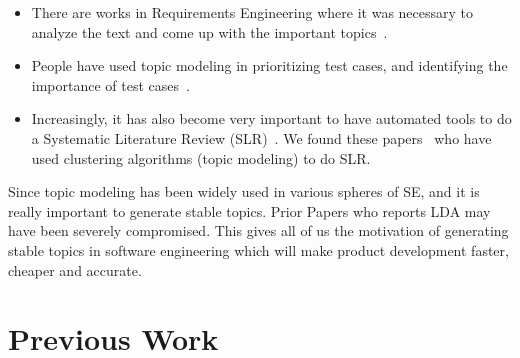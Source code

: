 \documentclass[conference]{IEEEtran}
\theoremstyle{break}
\begin{document}
\begin{itemize}
    \item There are works in Requirements Engineering where it was necessary to analyze the text and come up with the important topics~\cite{asuncion2010software, thomas2014studying, massey2013automated}.
    \item People have used topic modeling in prioritizing test cases, and identifying the importance of test cases~\cite{hemmati2015prioritizing, zhang2015inferring, yang2015predicting}.
    \item Increasingly, it has also become very important to have automated tools to do a Systematic Literature Review (SLR)~\cite{tsafnat2014systematic}. We found these papers~\cite{restificar2012inferring,alreview,marshall2013tools} who have used clustering algorithms (topic modeling) to do SLR.
\end{itemize}

Since topic modeling has been widely used in various spheres of SE, and it is really important to generate stable topics. Prior Papers who reports LDA may have been severely compromised. This gives all of us the motivation of generating stable topics in software engineering which will make product development faster, cheaper and accurate.

\section{Previous Work}
\end{document}
